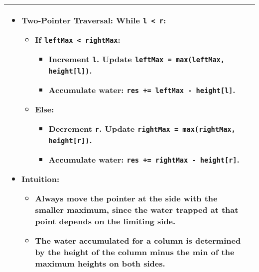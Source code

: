 \begin{summary}
\begin{center}
\begin{tabular}{ll}
{\begin{itemize}
                    \item \textbf{Two-Pointer Traversal:} \textbf{While} \texttt{l < r}:
                    \begin{itemize}
                        \item If \texttt{leftMax < rightMax}:
                        \begin{itemize}
                            \item Increment \texttt{l}. Update \texttt{leftMax = max(leftMax, height[l])}.
                            \item Accumulate water: \texttt{res += leftMax - height[l]}.
                        \end{itemize}
                        \item Else:
                        \begin{itemize}
                            \item Decrement \texttt{r}. Update \texttt{rightMax = max(rightMax, height[r])}.
                            \item Accumulate water: \texttt{res += rightMax - height[r]}.
                        \end{itemize}
                    \end{itemize}
                    \item \textbf{Intuition:} 
                    \begin{itemize}
                        \item Always move the pointer at the side with the smaller maximum, since the water trapped at that point depends on the limiting side.
                        \item The water accumulated for a column is determined by the height of the column minus the min of the maximum heights on both sides.
                    \end{itemize}
                \end{itemize}                
            } \\ 
            \midrule
            \bottomrule
        \end{tabular}
    \end{center}
\end{summary}


